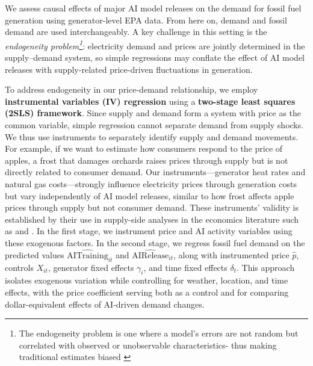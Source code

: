 \documentclass[sigconf,authordraft]{acmart}
\begin{document}
We assess causal effects of major AI model releases on the demand for fossil fuel generation using generator-level EPA data. From here on, demand and fossil demand are used interchangeably. %
A key challenge in this setting is the \emph{endogeneity problem\footnote{The endogeneity problem is one where a model's errors are not random but correlated with observed or unobservable characteristics- thus making traditional estimates biased \cite{gordon2015endogeneity}}}: electricity demand and prices are jointly determined in the supply--demand system, so simple regressions may conflate the effect of AI model releases with supply-related price-driven fluctuations in generation. %

To address endogeneity in our price-demand relationship, we employ \textbf{instrumental variables (IV) regression} using a \textbf{two-stage least squares (2SLS) framework}. Since supply and demand form a system with price as the common variable, simple regression cannot separate demand from supply shocks. We thus use instruments to separately identify supply and demand movements. For example, if we want to estimate how consumers respond to the price of apples, a frost that damages orchards raises prices through supply but is not directly related to consumer demand. Our instruments—generator heat rates and natural gas costs—strongly influence electricity prices through generation costs but vary independently of AI model releases, similar to how frost affects apple prices through supply but not consumer demand. These instruments' validity is established by their use in supply-side analyses in the economics literature such as \cite{knittel2015natural} and \cite{cicala2022imperfect}. In the first stage, we instrument price and AI activity variables using these exogenous factors. In the second stage, we regress fossil fuel demand on the predicted values $\widehat{\text{AITraining}}_{it}$ and $\widehat{\text{AIRelease}}_{it}$, along with instrumented price $\hat{p}$, controls $X_{it}$, generator fixed effects $\gamma_i$, and time fixed effects $\delta_t$. This approach isolates exogenous variation while controlling for weather, location, and time effects, with the price coefficient serving both as a control and for comparing dollar-equivalent effects of AI-driven demand changes.
\end{document}
